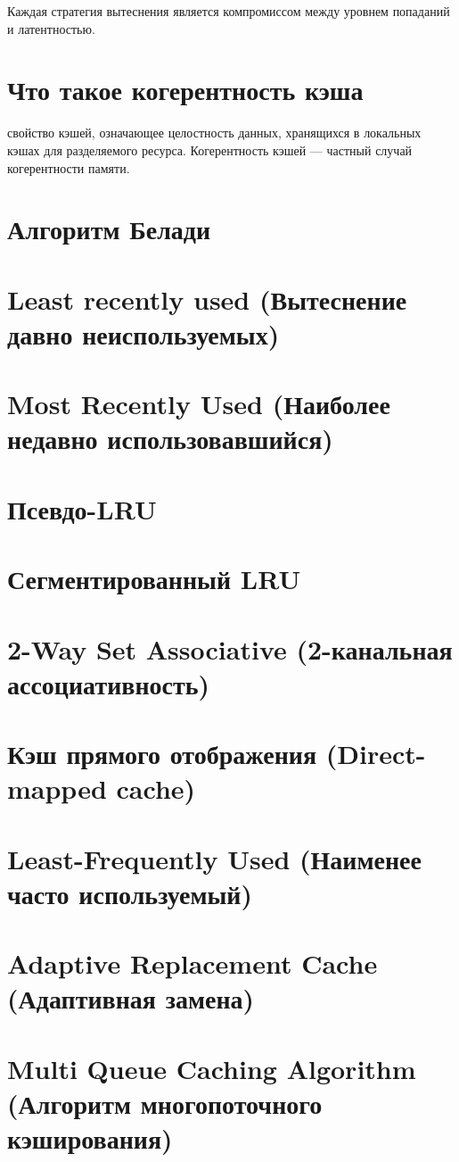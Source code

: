 Каждая стратегия вытеснения является компромиссом между уровнем попаданий и латентностью. 

\section{Что такое когерентность кэша}
свойство кэшей, означающее целостность данных, хранящихся в локальных кэшах для разделяемого ресурса. Когерентность кэшей — частный случай когерентности памяти. 

\section{Алгоритм Белади}
\section{Least recently used (Вытеснение давно неиспользуемых)}
\section{Most Recently Used (Наиболее недавно использовавшийся)}
\section{ Псевдо-LRU}
\section{Сегментированный LRU}
\section{2-Way Set Associative (2-канальная ассоциативность)}
\section{Кэш прямого отображения (Direct-mapped cache)}
\section{Least-Frequently Used (Наименее часто используемый)}
\section{ Adaptive Replacement Cache (Адаптивная замена)}
\section{Multi Queue Caching Algorithm (Алгоритм многопоточного кэширования)}